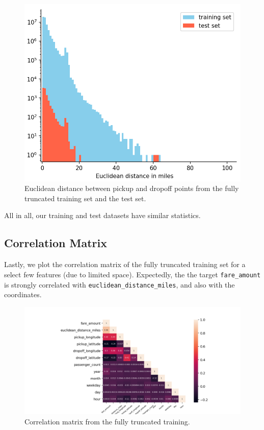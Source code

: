 \documentclass[12pt,letterpaper,final]{article}
\numberwithin{equation}{section}
\begin{document}
\begin{figure}[H]
\begin{center}
\includegraphics[width=.55\linewidth,keepaspectratio]{plots/dropped_outliers/euclidean_distance_miles_hist.png}
\caption{Euclidean distance between pickup and dropoff points from the fully truncated training set and the test set.}\label{euclidean_distance_miles_hist2}
\end{center}
\end{figure}

All in all, our training and test datasets have similar statistics. 

\subsection{Correlation Matrix}

Lastly, we plot the correlation matrix of the fully truncated training set for a select few features (due to limited space). Expectedly, the the target \verb|fare_amount| is strongly correlated with \verb|euclidean_distance_miles|, and also with the coordinates.

\begin{figure}[H]
\begin{center}
\includegraphics[width=1.1\linewidth,keepaspectratio]{plots/correlation_matrix.png}
\caption{Correlation matrix from the fully truncated training.}\label{corrmatrix}
\end{center}
\end{figure}
\end{document}
